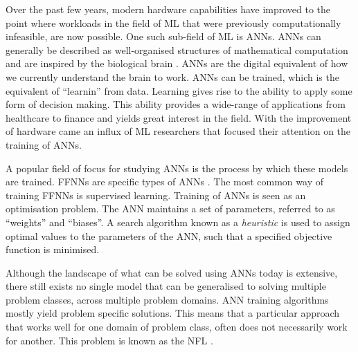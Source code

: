 Over the past few years, modern hardware capabilities have improved to the
point where workloads in the field of \ac{ML} that were previously computationally
infeasible, are now possible. One such sub-field of \ac{ML} is \acp{ANN}. \acp{ANN} can generally be described as well-organised structures of mathematical computation and are inspired by the biological brain \cite{ref:engelbrecht:2007}. \acp{ANN} are the digital equivalent of how we currently understand the brain to work. \acp{ANN} can be trained, which is the equivalent of ``learnin'' from data. Learning gives rise to the ability to apply some form of decision making. This ability provides a wide-range of applications from healthcare to finance and yields great interest in the field. With the improvement of hardware came an influx of \ac{ML} researchers that focused
their attention on the training of \acp{ANN}.

A popular field of focus for studying \acp{ANN} is the process by which
these models are trained. \acp{FFNN} are specific types of
\acp{ANN} \cite{ref:reed:1999}. The most common way of training \acp{FFNN} is
supervised learning. Training of \acp{ANN} is seen as an optimisation problem. The \ac{ANN} maintains a set of parameters, referred to as ``weights'' and ``biases''. A search algorithm known as a \textit{heuristic}
\cite{ref:pearl:1984} is used to assign optimal values to the parameters of the \ac{ANN}, such that a specified objective function is minimised.

Although the landscape of what can be solved using \acp{ANN} today
is extensive, there still exists no single model that can be generalised to
solving multiple problem classes, across multiple problem domains. \acs{ANN} training algorithms mostly yield problem specific solutions. This means that a particular approach that works well for one domain of problem class, often does not necessarily work for another. This problem is known as the \ac{NFL} \cite{ref:wolpert:1997}.

